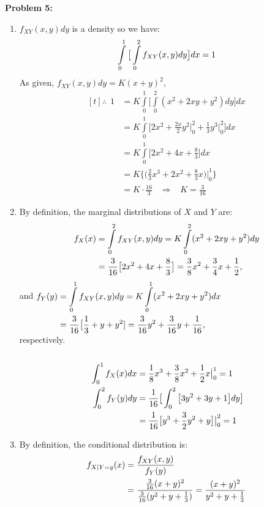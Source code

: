 \documentclass[letterpaper]{article}
\begin{document}
\newpage
\noindent \textbf{Problem 5:}
\begin{enumerate}
\setlength{\itemsep}{.1in}
\renewcommand{\labelenumi}{(\alph{enumi})}

\item $f_{XY}(x,y)dy$ is a density so we have:
$$\hfill \int \limits_{0}^{1} \big[\int \limits_{0}^{2} f_{XY}(x,y)dy\big]dx=1 \hfill$$
As given, $f_{XY}(x,y)dy=K(x+y)^2$,
$$\begin{aligned}[t] \therefore ~~ 1 &= K \int \limits_{0}^{1} \big[\int \limits_{0}^{2}(x^2+2xy+y^2)dy\big]dx \\ &= K \int \limits_{0}^{1} \big[2x^2+\frac{2x}{2}y^2 \big|_{0}^{2} + \frac{1}{3}y^3\big|_{0}^{2}\big]dx \\
&= K \int \limits_{0}^{1} \big[2x^2+4x + \frac{8}{3} \big]dx \\
&= K \big \{ \big( \frac{2}{3}x^3+2x^2 + \frac{8}{3}x \big) \big|_{0}^{1} \big \}\\
&= K\cdot \frac{16}{3} \hspace{10pt} \Longrightarrow \hspace{10pt}
\boxed{K = \frac{3}{16}}
\end{aligned}$$

\item By definition, the marginal distributions of $X$ and $Y$ are:
$$\hfill \begin{aligned}[t] f_X(x)&=\int \limits_{0}^{2}f_{XY}(x,y)dy=K\int \limits_{0}^{2}(x^2+2xy+y^2)dy\\
&=\frac{3}{16}\big[2x^2+4x+\frac{8}{3}\big]=\frac{3}{8}x^2+\frac{3}{4}x+\frac{1}{2}, \end{aligned} \hfill$$
and $\hfill \begin{aligned}[t]f_Y(y)&=\int \limits_{0}^{1}f_{XY}(x,y)dy=K\int \limits_{0}^{1}(x^2+2xy+y^2)dx\\
&=\frac{3}{16}\big[\frac{1}{3}+y+y^2]=\frac{3}{16}y^2+\frac{3}{16}y+\frac{1}{16}, \end{aligned} \hfill$\\
respectively.\\
\medskip
\\ \underline{}$$\hfill  \; \begin{aligned}[t] \int_0^1f_X(x)dx &= \frac{1}{8}x^3+\frac{3}{8}x^2+\frac{1}{2}x\big|_0^1=1 \\
\int_0^2 f_Y(y)dy &= \frac{1}{16}\big[ \int_0^2 \big[3y^2+3y+1 \big]dy \big] \\ &= \frac{1}{16}\big[y^3+\frac{3}{2}y^2+y \big]\big|_0^2 = 1\end{aligned} \hfill$$

\item
By definition, the conditional distribution is:
$$\hfill \begin{aligned}[t]f_{X|Y=y}(x)&=\frac{f_{XY}(x,y)}{f_Y(y)}\\&=\frac{\frac{3}{16}(x+y)^2}{\frac{3}{16}(y^2+y+\frac{1}{3})}=\frac{(x+y)^2}{y^2+y+\frac{1}{3}}\end{aligned} \hfill$$
\end{enumerate}
\end{document}
